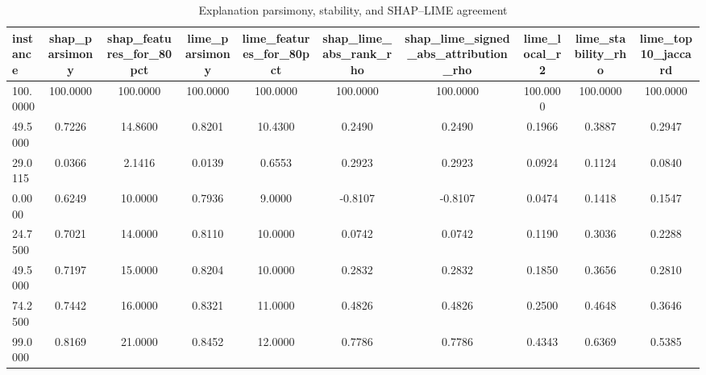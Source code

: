 \begin{table}
\centering
\caption{Explanation parsimony, stability, and SHAP--LIME agreement}
\label{tab:explanation_quality}
\begin{tabular}{lccccccccc}
\toprule
instance & shap_parsimony & shap_features_for_80pct & lime_parsimony & lime_features_for_80pct & shap_lime_abs_rank_rho & shap_lime_signed_abs_attribution_rho & lime_local_r2 & lime_stability_rho & lime_top10_jaccard \\
\midrule
100.0000 & 100.0000 & 100.0000 & 100.0000 & 100.0000 & 100.0000 & 100.0000 & 100.0000 & 100.0000 & 100.0000 \\
49.5000 & 0.7226 & 14.8600 & 0.8201 & 10.4300 & 0.2490 & 0.2490 & 0.1966 & 0.3887 & 0.2947 \\
29.0115 & 0.0366 & 2.1416 & 0.0139 & 0.6553 & 0.2923 & 0.2923 & 0.0924 & 0.1124 & 0.0840 \\
0.0000 & 0.6249 & 10.0000 & 0.7936 & 9.0000 & -0.8107 & -0.8107 & 0.0474 & 0.1418 & 0.1547 \\
24.7500 & 0.7021 & 14.0000 & 0.8110 & 10.0000 & 0.0742 & 0.0742 & 0.1190 & 0.3036 & 0.2288 \\
49.5000 & 0.7197 & 15.0000 & 0.8204 & 10.0000 & 0.2832 & 0.2832 & 0.1850 & 0.3656 & 0.2810 \\
74.2500 & 0.7442 & 16.0000 & 0.8321 & 11.0000 & 0.4826 & 0.4826 & 0.2500 & 0.4648 & 0.3646 \\
99.0000 & 0.8169 & 21.0000 & 0.8452 & 12.0000 & 0.7786 & 0.7786 & 0.4343 & 0.6369 & 0.5385 \\
\bottomrule
\end{tabular}
\end{table}
